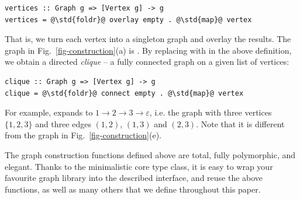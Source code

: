 \begin{verbatim}
vertices :: Graph g => [Vertex g] -> g
vertices = @\std{foldr}@ overlay empty . @\std{map}@ vertex
\end{verbatim}

\noindent
That is, we turn each vertex into a singleton graph and overlay the results.
The graph in Fig.~\ref{fig-construction}(a) is .
By replacing  with  in the above
definition, we obtain a directed \emph{clique} -- a fully connected graph
on a given list of vertices:

\begin{verbatim}
clique :: Graph g => [Vertex g] -> g
clique = @\std{foldr}@ connect empty . @\std{map}@ vertex
\end{verbatim}

\noindent
For example,  expands to
$1 \rightarrow 2 \rightarrow 3 \rightarrow \varepsilon$, i.e.
the graph with three vertices $\{1, 2, 3\}$ and three edges $(1, 2)$, $(1, 3)$ and
$(2, 3)$. Note that it is different from the graph in Fig.~\ref{fig-construction}(e).

The graph construction functions defined above are total, fully polymorphic, and elegant.
Thanks to the minimalistic core type class, it is easy to wrap your favourite
graph library into the described interface, and reuse the above functions, as
well as many others that we define throughout this paper.
